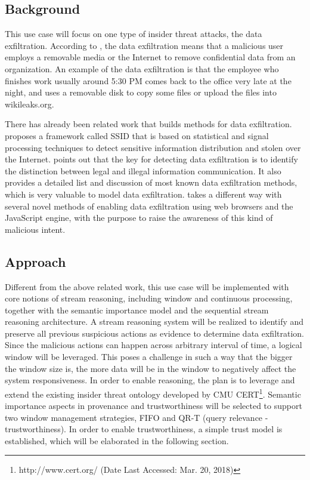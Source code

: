 \subsection{Background}
This use case will focus on one type of insider threat attacks, the data exfiltration. 
According to \cite{CMU-CERT}, the data exfiltration means that a malicious user employs a removable media or the Internet to remove confidential data from an organization.
An example of the data exfiltration is that the employee who finishes work usually around 5:30 PM comes back to the office very late at the night, and uses a removable disk to copy some files or upload the files into wikileaks.org.

There has already been related work that builds methods for data exfiltration. 
\cite{liu2009sidd} proposes a framework called SSID that is based on statistical and signal processing techniques to detect sensitive information distribution and stolen over the Internet. 
\cite{giani2006data} points out that the key for detecting data exfiltration is to identify the distinction between legal and illegal information communication. 
It also provides a detailed list and discussion of most known data exfiltration methods, which is very valuable to model data exfiltration. 
\cite{born2010browser} takes a different way with several novel methods of enabling data exfiltration using web browsers and the JavaScript engine, with the purpose to raise the awareness of this kind of malicious intent. 
%
\subsection{Approach}
Different from the above related work, this use case will be implemented with core notions of stream reasoning, including window and continuous processing, together with the semantic importance model and the sequential stream reasoning architecture. 
A stream reasoning system will be realized to identify and preserve all previous suspicious actions as evidence to determine data exfiltration.
Since the malicious actions can happen across arbitrary interval of time, a logical window will be leveraged. 
This poses a challenge in such a way that the bigger the window size is, the more data will be in the window to negatively affect the system responsiveness. 
In order to enable reasoning, the plan is to leverage and extend the existing insider threat ontology developed by CMU  CERT\footnote{http://www.cert.org/ (Date Last Accessed: Mar. 20, 2018)}. 
Semantic importance aspects in provenance and trustworthiness will be selected to support two window management strategies, FIFO and QR-T (query relevance - trustworthiness). 
In order to enable trustworthiness, a simple trust model is established, which will be elaborated in the following section. 
%
